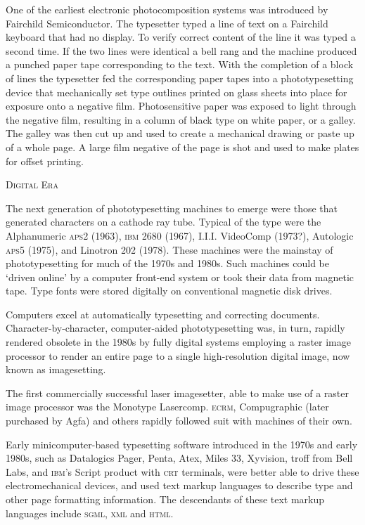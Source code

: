 \documentclass{slipbox}
\makeatletter
\def\section#1{\addvspace{\baselineskip}\noindent\textsc{#1}\par\addvspace{\baselineskip}\@afterheading\@afterindentfalse}
\makeatother
\begin{document}
\begin{slip}
    One of the earliest electronic photocomposition systems was introduced by Fairchild Semiconductor. The typesetter typed a line of text on a Fairchild keyboard that had no display. To verify correct content of the line it was typed a second time. If the two lines were identical a bell rang and the machine produced a punched paper tape corresponding to the text. With the completion of a block of lines the typesetter fed the corresponding paper tapes into a phototypesetting device that mechanically set type outlines printed on glass sheets into place for exposure onto a negative film. Photosensitive paper was exposed to light through the negative film, resulting in a column of black type on white paper, or a galley. The galley was then cut up and used to create a mechanical drawing or paste up of a whole page. A large film negative of the page is shot and used to make plates for offset printing.

    \section{Digital Era}
    The next generation of phototypesetting machines to emerge were those that generated characters on a cathode ray tube. Typical of the type were the Alphanumeric \textsc{aps}2 (1963), \textsc{ibm} 2680 (1967), I.I.I. VideoComp (1973?), Autologic \textsc{aps}5 (1975), and Linotron 202 (1978). These machines were the mainstay of phototypesetting for much of the 1970s and 1980s. Such machines could be `driven online' by a computer front-end system or took their data from magnetic tape. Type fonts were stored digitally on conventional magnetic disk drives.

    Computers excel at automatically typesetting and correcting documents. Character-by-character, computer-aided phototypesetting was, in turn, rapidly rendered obsolete in the 1980s by fully digital systems employing a raster image processor to render an entire page to a single high-resolution digital image, now known as imagesetting.

    The first commercially successful laser imagesetter, able to make use of a raster image processor was the Monotype Lasercomp. \textsc{ecrm}, Compugraphic (later purchased by Agfa) and others rapidly followed suit with machines of their own.

    Early minicomputer-based typesetting software introduced in the 1970s and early 1980s, such as Datalogics Pager, Penta, Atex, Miles 33, Xyvision, troff from Bell Labs, and \textsc{ibm}'s Script product with \textsc{crt} terminals, were better able to drive these electromechanical devices, and used text markup languages to describe type and other page formatting information. The descendants of these text markup languages include \textsc{sgml}, \textsc{xml} and \textsc{html}.


\end{slip}
\end{document}
